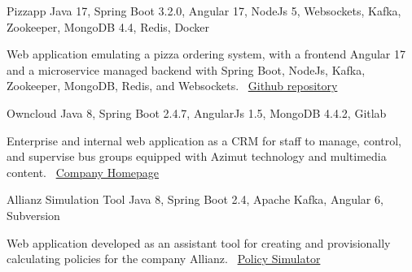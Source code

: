 \documentclass[]{awesome-cv}
\begin{document}
\vspace{25mm}
\begin{cventries}
	\vspace{-3mm}
	\cventry
	{}
	{Pizzapp \vspace{-5mm}}
	{Java 17, Spring Boot 3.2.0, Angular 17, NodeJs 5, Websockets, Kafka, Zookeeper, MongoDB 4.4, Redis, Docker \vspace{-5mm}}
	{}
	{\begin{sectionnormaltext}
		\item {Web application emulating a pizza ordering system, with a frontend Angular 17 and a microservice managed backend with Spring Boot, NodeJs, Kafka, Zookeeper, MongoDB, Redis, and Websockets. 
		\newline \faLink\ \href{https://github.com/flautarian/pizzapp}{Github repository}}
	\end{sectionnormaltext}}

	\vspace{-3mm}
	\cventry
	{}
	{Owncloud \vspace{-5mm}}
	{Java 8, Spring Boot 2.4.7, AngularJs 1.5, MongoDB 4.4.2, Gitlab \vspace{-5mm}}
	{}
	{\begin{sectionnormaltext}
		\item {Enterprise and internal web application as a CRM for staff to manage, control, and supervise bus groups equipped with Azimut technology and multimedia content. 
		\newline \faLink\ \href{https://www.azimutelectronics.com}{Company Homepage}}
	\end{sectionnormaltext}}

	\vspace{-3mm}
	\cventry
	{}
	{Allianz Simulation Tool \vspace{-5mm}}
	{Java 8, Spring Boot 2.4, Apache Kafka, Angular 6, Subversion \vspace{-5mm}}
	{}
	{\begin{sectionnormaltext}
		\item{Web application developed as an assistant tool for creating and provisionally calculating policies for the company Allianz.
      \newline \faLink\ \href{https://www.allianzdirect.es/seguro-de-coche/calcular-precio/}{Policy Simulator}}
	\end{sectionnormaltext}}
	

\end{cventries}
\end{document}
